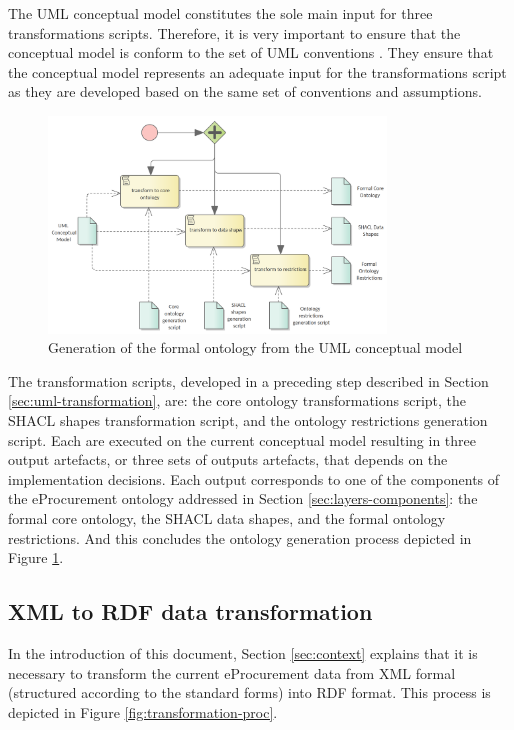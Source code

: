 	The UML conceptual model constitutes the sole main input for three transformations scripts. Therefore, it is very important to ensure that the conceptual model is conform to the set of UML conventions \cite{costetchi2020b}. They ensure that the conceptual model represents an adequate input for the transformations script as they are developed based on the same set of conventions and assumptions.
		
	\begin{figure}[!ht]		
		\centering
		\includegraphics[width=0.8\textwidth]{../img/formalOntologyGeneration.png}
		\caption{Generation of the formal ontology from the UML conceptual model}
		\label{fig:ontology-generation}
	\end{figure}
	
	The transformation scripts, developed in a preceding step described in Section \ref{sec:uml-transformation}, are: the core ontology transformations script, the SHACL shapes transformation script, and the ontology restrictions generation script. Each are executed on the current conceptual model resulting in three output artefacts,  or three sets of outputs artefacts, that depends on the implementation decisions. Each output corresponds to one of the components of the eProcurement ontology addressed in Section \ref{sec:layers-components}: the formal core ontology, the SHACL data shapes, and the formal ontology restrictions. And this concludes the ontology generation process depicted in Figure \ref{fig:ontology-generation}. 	

	\subsection{XML to RDF data transformation}
	\label{sec:xml2rdf}

	In the introduction of this document, Section \ref{sec:context} explains that it is necessary to transform the current eProcurement data from XML formal (structured according to the standard forms) into RDF format. This process is depicted in Figure \ref{fig:transformation-proc}.
	
